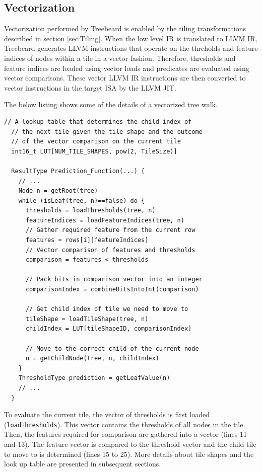 \subsection{Vectorization}
\label{sec:Vectorization}
Vectorization performed by Treebeard is enabled by the tiling transformations described in section \ref{sec:Tiling}. 
When the low level IR is translated to LLVM IR, Treebeard generates LLVM instructions that operate on the threholds and feature indices 
of nodes within a tile in a vector fashion. Therefore, thresholds and feature indices are loaded using vector loads and predicates are 
evaluated using vector comparisons. These vector LLVM IR instructions are then converted to vector instructions in the target ISA by 
the LLVM JIT.

The below listing shows some of the details of a vectorized tree walk. 
\begin{lstlisting}[style=c++]
  // A lookup table that determines the child index of
  // the next tile given the tile shape and the outcome
  // of the vector comparison on the current tile
  int16_t LUT[NUM_TILE_SHAPES, pow(2, TileSize)]
  
  ResultType Prediction_Function(...) {
    // ...
    Node n = getRoot(tree)
    while (isLeaf(tree, n)==false) do {
      thresholds = loadThresholds(tree, n)
      featureIndices = loadFeatureIndices(tree, n)
      // Gather required feature from the current row
      features = rows[i][featureIndices]
      // Vector comparison of features and thresholds
      comparison = features < thresholds
      
      // Pack bits in comparison vector into an integer
      comparisonIndex = combineBitsIntoInt(comparison)
      
      // Get child index of tile we need to move to
      tileShape = loadTileShape(tree, n)
      childIndex = LUT[tileShapeID, comparisonIndex]
      
      // Move to the correct child of the current node
      n = getChildNode(tree, n, childIndex) 
    }
    ThresholdType prediction = getLeafValue(n)
    // ...
  }  
\end{lstlisting}
To evaluate the current tile, the vector of thresholds is first loaded (\texttt{loadThresholds}). This vector contains the thresholds of all nodes in the tile. Then, the features required for comparison are gathered into a vector (lines 11 and 13). The feature vector is compared to the threshold vector and the child tile to move to is determined (lines 15 to 25). More details about tile shapes and the look up table are presented in subsequent sections.

